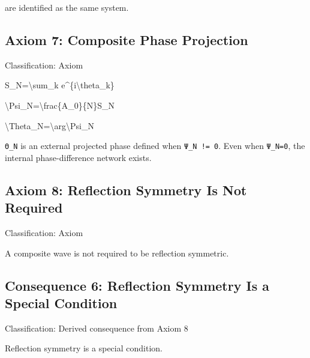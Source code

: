 \documentclass[
  a4paper]{article}
\newenvironment{Shaded}{}{}
\newcommand{\NormalTok}[1]{#1}
\begin{document}
are identified as the same system.

\subsection{Axiom 7: Composite Phase
Projection}\label{axiom-7-composite-phase-projection}

Classification: Axiom

\begin{Shaded}
\begin{Highlighting}[]
\NormalTok{S\_N=\textbackslash{}sum\_k e\^{}\{i\textbackslash{}theta\_k\}}
\end{Highlighting}
\end{Shaded}

\begin{Shaded}
\begin{Highlighting}[]
\NormalTok{\textbackslash{}Psi\_N=\textbackslash{}frac\{A\_0\}\{N\}S\_N}
\end{Highlighting}
\end{Shaded}

\begin{Shaded}
\begin{Highlighting}[]
\NormalTok{\textbackslash{}Theta\_N=\textbackslash{}arg\textbackslash{}Psi\_N}
\end{Highlighting}
\end{Shaded}

\texttt{Θ\_N} is an external projected phase defined when
\texttt{Ψ\_N\ !=\ 0}. Even when \texttt{Ψ\_N=0}, the internal
phase-difference network exists.

\subsection{Axiom 8: Reflection Symmetry Is Not
Required}\label{axiom-8-reflection-symmetry-is-not-required}

Classification: Axiom

A composite wave is not required to be reflection symmetric.

\subsection{Consequence 6: Reflection Symmetry Is a Special
Condition}\label{consequence-6-reflection-symmetry-is-a-special-condition}

Classification: Derived consequence from Axiom 8

Reflection symmetry is a special condition.
\end{document}
